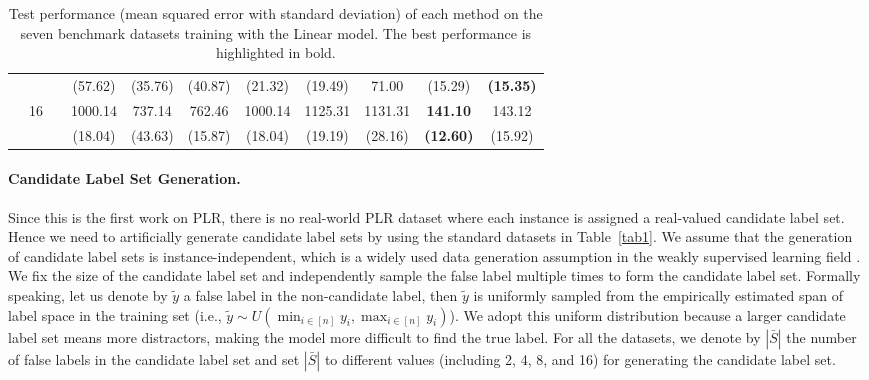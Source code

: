 \documentclass[letterpaper]{article} %
\begin{document}
\begin{table}[!t]
{\begin{tabular}{clcccccccc|cc}
\multicolumn{2}{c}{}                             &                       &                             & (57.62)                   & (35.76)                   & (40.87)                     & (21.32)                   & (19.49)                   & 71.00                       & (15.29)             & \textbf{(15.35)}      \\
\multicolumn{2}{c}{}                             & \multirow{2}{*}{16}   &                             & 1000.14                   & 737.14                    & 762.46                      & 1000.14                   & 1125.31                   & 1131.31                     & \textbf{141.10}     & 143.12                \\
\multicolumn{2}{c}{}                             &                       &                             & (18.04)                   & (43.63)                   & (15.87)                     & (18.04)                   & (19.19)                   & (28.16)                     & \textbf{(12.60)}    & (15.92)
\\
\bottomrule
\end{tabular}
}
\caption{Test performance (mean squared error with standard deviation) of each method on the seven benchmark datasets training with the Linear model. The best performance is highlighted in bold.}
\label{tab3}
\end{table}
\paragraph{Candidate Label Set Generation.} Since this is the first work on PLR, there is no real-world PLR dataset where each instance is assigned a real-valued candidate label set. Hence we need to artificially generate candidate label sets by using the standard datasets in Table~\ref{tab1}. We assume that the generation of candidate label sets is instance-independent, which is a widely used data generation assumption in the weakly supervised learning field \cite{patrini2017making,ghosh2017robust,ishida2019complementary,feng2020provably}. We fix the size of the candidate label set and independently sample the false label multiple times to form the candidate label set. Formally speaking, let us denote by $\widetilde{y}$ a false label in the non-candidate label, then $\widetilde{y}$ is uniformly sampled from the empirically estimated span of label space in the training set (i.e., $\widetilde{y}\sim U(\min_{i\in [n]}y_i, \max_{i\in [n]}y_i)$). We adopt this uniform distribution because a larger candidate label set means more distractors, making the model more difficult to find the true label. For all the datasets, we denote by $|\bar{S}|$ the number of false labels in the candidate label set and set $|\bar{S}|$ to different values (including 2, 4, 8, and 16) for generating the candidate label set.
\end{document}
